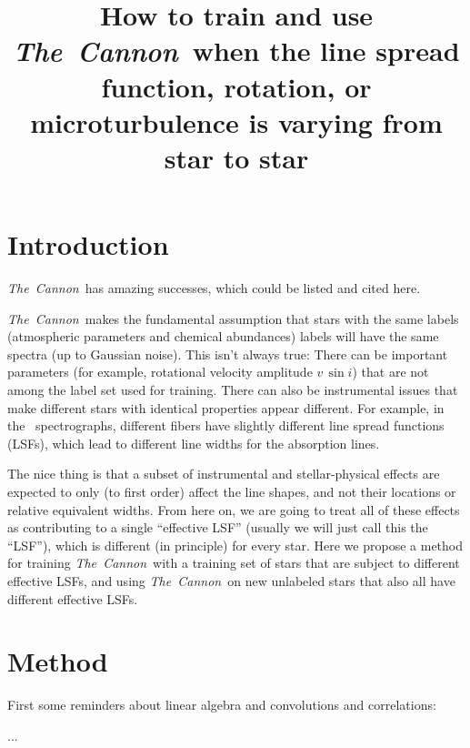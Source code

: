 \documentclass[12pt, preprint]{aastex}
\newcommand{\acronym}[1]{{\small{#1}}}
\newcommand{\project}[1]{\textsl{#1}}
\newcommand{\tc}{\project{The~Cannon}}
\begin{document}
\title{How to train and use \tc\ when the line spread function, rotation, or microturbulence is varying from star to star}

\section{Introduction}

\tc\ has amazing successes, which could be listed and cited here.

\tc\ makes the fundamental assumption that stars with the same labels
(atmospheric parameters and chemical abundances) labels will have the
same spectra (up to Gaussian noise).
This isn't always true:
There can be important parameters (for example, rotational velocity
amplitude $v\,\sin i$) that are not among the label set used for
training.
There can also be instrumental issues that make different stars with
identical properties appear different.
For example, in the \apogee\ spectrographs, different fibers have
slightly different line spread functions (\acronym{LSF}s), which lead
to different line widths for the absorption lines.

The nice thing is that a subset of instrumental and stellar-physical
effects are expected to only (to first order) affect the line shapes,
and not their locations or relative equivalent widths.
From here on, we are going to treat all of these effects as
contributing to a single ``effective \acronym{LSF}'' (usually we will
just call this the ``\acronym{LSF}''), which is different (in
principle) for every star.
Here we propose a method for training \tc\ with a training set of
stars that are subject to different effective LSFs, and using \tc\ on
new unlabeled stars that also all have different effective LSFs.

\section{Method}

First some reminders about linear algebra and convolutions and
correlations:

...
\end{document}
